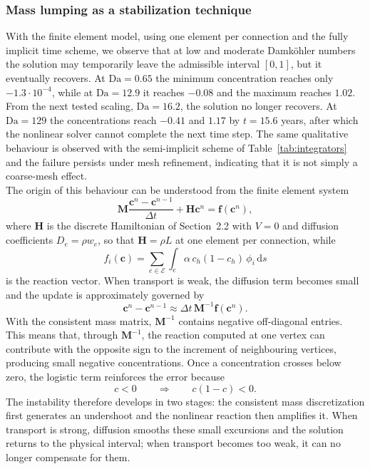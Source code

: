 \subsubsection{Mass lumping as a stabilization technique}
\label{sec:boundary}

With the finite element model, using one element per connection and the fully implicit time scheme, we observe that at low and moderate Damk\"ohler numbers the solution may temporarily leave the admissible interval $[0,1]$, but it eventually recovers. At $\mathrm{Da}=0.65$ the minimum concentration reaches only $-1.3\cdot10^{-4}$, while at $\mathrm{Da}=12.9$ it reaches $-0.08$ and the maximum reaches $1.02$. From the next tested scaling, $\mathrm{Da}=16.2$, the solution no longer recovers. At $\mathrm{Da}=129$ the concentrations reach $-0.41$ and $1.17$ by $t=15.6$ years, after which the nonlinear solver cannot complete the next time step. The same qualitative behaviour is observed with the semi-implicit scheme of Table~\ref{tab:integrators} and the failure persists under mesh refinement, indicating that it is not simply a coarse-mesh effect.\\
The origin of this behaviour can be understood from the finite element system
\[
\mathbf{M}\frac{\mathbf{c}^{n}-\mathbf{c}^{n-1}}{\Delta t}
+
\mathbf{H}\mathbf{c}^{n}
=
\mathbf{f}(\mathbf{c}^{n}),
\]
where $\mathbf{H}$ is the discrete Hamiltonian of Section~2.2 with $V=0$ and diffusion coefficients $D_e=\rho w_e$, so that $\mathbf{H}=\rho L$ at one element per connection, while
\[
f_i(\mathbf{c})
=
\sum_{e\in\mathcal{E}}
\int_e
\alpha\,c_h(1-c_h)\,\phi_i\,\mathrm{d}s
\]
is the reaction vector. When transport is weak, the diffusion term becomes small and the update is approximately governed by
\[
\mathbf{c}^{n}-\mathbf{c}^{n-1}
\approx
\Delta t\,\mathbf{M}^{-1}\mathbf{f}(\mathbf{c}^{n}).
\]
With the consistent mass matrix, $\mathbf{M}^{-1}$ contains negative off-diagonal entries. This means that, through $\mathbf{M}^{-1}$, the reaction computed at one vertex can contribute with the opposite sign to the increment of neighbouring vertices, producing small negative concentrations. Once a concentration crosses below zero, the logistic term reinforces the error because
\[
c<0
\qquad\Longrightarrow\qquad
c(1-c)<0.
\]
The instability therefore develops in two stages: the consistent mass discretization first generates an undershoot and the nonlinear reaction then amplifies it. When transport is strong, diffusion smooths these small excursions and the solution returns to the physical interval; when transport becomes too weak, it can no longer compensate for them.\\
